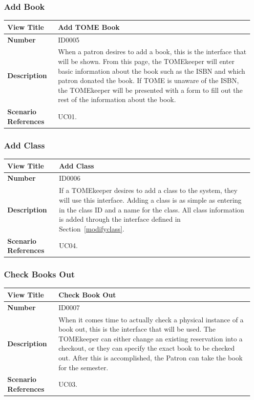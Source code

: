 \documentclass[12pt,titlepage]{article}
\begin{document}
\subsubsection{Add Book}
\begin{longtable}{|p{}|p{}|}
	\hline
	\textbf{View Title} & Add TOME Book\\
	\hline
	\textbf{Number} & ID0005 \\
	\hline
	\textbf{Description} & When a patron desires to add a book, this is the interface that will be shown.  From this page, the TOMEkeeper will enter basic information about the book such as the ISBN and which patron donated the book.  If TOME is unaware of the ISBN, the TOMEkeeper will be presented with a form to fill out the rest of the information about the book.\\
	\hline
	\textbf{Scenario References} & UC01.\\
	\hline
\end{longtable}

\subsubsection{Add Class}
\begin{longtable}{|p{}|p{}|}
	\hline
	\textbf{View Title} & Add Class\\
	\hline
	\textbf{Number} & ID0006 \\
	\hline
	\textbf{Description} & If a TOMEkeeper desires to add a class to the system, they will use this interface.  Adding a class is as simple as entering in the class ID and a name for the class.  All class information is added through the interface defined in Section~\ref{modifyclass}.\\
	\hline
	\textbf{Scenario References} & UC04.\\
	\hline
\end{longtable}

\subsubsection{Check Books Out}
\begin{longtable}{|p{}|p{}|}
	\hline
	\textbf{View Title} & Check Book Out\\
	\hline
	\textbf{Number} & ID0007 \\
	\hline
	\textbf{Description} & When it comes time to actually check a physical instance of a book out, this is the interface that will be used.  The TOMEkeeper can either change an existing reservation into a checkout, or they can specify the exact book to be checked out.  After this is accomplished, the Patron can take the book for the semester.\\
	\hline
	\textbf{Scenario References} & UC03.\\
	\hline
\end{longtable}
\end{document}
